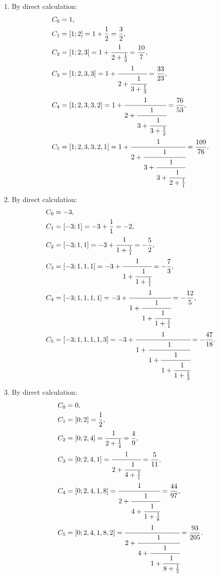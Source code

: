 \begin{solution}
    \begin{enumerate}
        \item By direct calculation:
        \begin{align*}
            C_0 &= 1, \\
            C_1 &= [1; 2] = 1 + \frac{1}{2} = \frac{3}{2},\\
            C_2 &= [1; 2, 3] = 1 + \cfrac{1}{2 + \frac{1}{3}} = \frac{10}{7}, \\
            C_3 &= [1; 2, 3, 3] = 1 + \cfrac{1}{2 + \cfrac{1}{3 + \frac{1}{3}}} = \frac{33}{23}, \\
            C_4 &= [1; 2, 3, 3, 2] = 1 + \cfrac{1}{2 + \cfrac{1}{3 + \cfrac{1}{3 + \frac{1}{2}}}} = \frac{76}{53}, \\
            C_5 &= [1; 2, 3, 3, 2, 1] = 1 + \cfrac{1}{2 + \cfrac{1}{3 + \cfrac{1}{3 + \cfrac{1}{2 + \frac{1}{1}}}}} = \frac{109}{76}. 
        \end{align*}
        \item By direct calculation:
        \begin{align*}
            C_0 &= -3, \\
            C_1 &= [-3; 1] = -3 + \frac{1}{1} = -2,\\
            C_2 &= [-3; 1, 1] = -3 + \cfrac{1}{1 + \frac{1}{1}} = -\frac{5}{2}, \\
            C_3 &= [-3; 1, 1, 1] = -3 + \cfrac{1}{1 + \cfrac{1}{1 + \frac{1}{1}}} = -\frac{7}{3}, \\
            C_4 &= [-3; 1, 1, 1, 1] = -3 + \cfrac{1}{1 + \cfrac{1}{1 + \cfrac{1}{1 + \frac{1}{1}}}} = -\frac{12}{5}, \\
            C_5 &= [-3; 1, 1, 1, 1, 3] = -3 + \cfrac{1}{1 + \cfrac{1}{1 + \cfrac{1}{1 + \cfrac{1}{1 + \frac{1}{3}}}}} = -\frac{47}{18}. \\
        \end{align*}
        \item By direct calculation:
        \begin{align*}
            C_0 &=0, \\
            C_1 &= [0; 2] = \frac{1}{2},\\
            C_2 &= [0; 2, 4] = \cfrac{1}{2 + \frac{1}{4}} = \frac{4}{9}, \\
            C_3 &= [0; 2, 4, 1] = \cfrac{1}{2 + \cfrac{1}{4 + \frac{1}{1}}} = \frac{5}{11}, \\
            C_4 &= [0; 2, 4, 1, 8] = \cfrac{1}{2 + \cfrac{1}{4 + \cfrac{1}{1 + \frac{1}{8}}}} = \frac{44}{97}, \\
            C_5 &= [0; 2, 4, 1, 8, 2] = \cfrac{1}{2 + \cfrac{1}{4 + \cfrac{1}{1 + \cfrac{1}{8 + \frac{1}{2}}}}} = \frac{93}{205}. \\
        \end{align*}
    \end{enumerate}
\end{solution}

